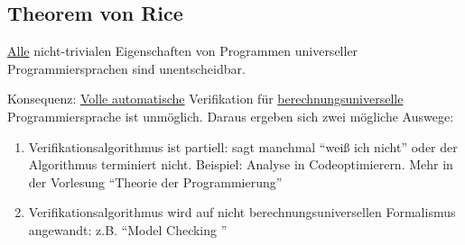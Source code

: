 \subsection*{Theorem von Rice}
\underline{Alle} nicht-trivialen Eigenschaften von Programmen universeller Programmiersprachen sind unentscheidbar.

Konsequenz: \underline{Volle automatische} Verifikation für \underline{berechnungsuniverselle} Programmiersprache ist unmöglich. Daraus ergeben sich zwei mögliche Auswege:

\begin{enumerate}
	\item Verifikationsalgorithmus ist partiell: sagt manchmal \enquote{weiß ich nicht} oder der Algorithmus terminiert nicht. Beispiel: Analyse in Codeoptimierern. Mehr in der Vorlesung \enquote{Theorie der Programmierung}
	\item Verifikationsalgorithmus wird auf nicht berechnungsuniversellen Formalismus angewandt: z.B. \enquote{Model Checking }
\end{enumerate}
\cleardoubleoddemptypage
